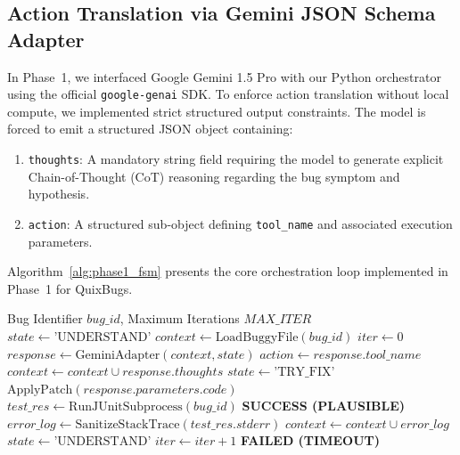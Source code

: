 \documentclass[12pt,a4paper]{report}
\begin{document}
\subsection{Action Translation via Gemini JSON Schema Adapter}
In Phase~1, we interfaced Google Gemini 1.5 Pro with our Python orchestrator using the official \texttt{google-genai} SDK. To enforce action translation without local compute, we implemented strict structured output constraints. The model is forced to emit a structured JSON object containing:
\begin{enumerate}
    \item \texttt{thoughts}: A mandatory string field requiring the model to generate explicit Chain-of-Thought (CoT) reasoning regarding the bug symptom and hypothesis.
    \item \texttt{action}: A structured sub-object defining \texttt{tool\_name} and associated execution parameters.
\end{enumerate}

Algorithm~\ref{alg:phase1_fsm} presents the core orchestration loop implemented in Phase~1 for QuixBugs.

\begin{algorithm}[htbp]
\caption{Phase 1 LAM Finite State Machine Orchestration Loop}
\label{alg:phase1_fsm}
\begin{algorithmic}[1]
\Require Bug Identifier $\mathit{bug\_id}$, Maximum Iterations $\mathit{MAX\_ITER}$
\State $\mathit{state} \gets \text{'UNDERSTAND'}$
\State $\mathit{context} \gets \text{LoadBuggyFile}(\mathit{bug\_id})$
\State $\mathit{iter} \gets 0$
    \State $\mathit{response} \gets \text{GeminiAdapter}(\mathit{context}, \mathit{state})$
    \State $\mathit{action} \gets \mathit{response}.\mathit{tool\_name}$
        \State $\mathit{context} \gets \mathit{context} \cup \mathit{response}.\mathit{thoughts}$
        \State $\mathit{state} \gets \text{'TRY\_FIX'}$
        \State $\text{ApplyPatch}(\mathit{response}.\mathit{parameters}.\mathit{code})$
        \State $\mathit{test\_res} \gets \text{RunJUnitSubprocess}(\mathit{bug\_id})$
            \State \Return \textbf{SUCCESS (PLAUSIBLE)}
        \Else
            \State $\mathit{error\_log} \gets \text{SanitizeStackTrace}(\mathit{test\_res}.\mathit{stderr})$
            \State $\mathit{context} \gets \mathit{context} \cup \mathit{error\_log}$
            \State $\mathit{state} \gets \text{'UNDERSTAND'}$
        \EndIf
    \EndIf
    \State $\mathit{iter} \gets \mathit{iter} + 1$
\EndWhile
\State \Return \textbf{FAILED (TIMEOUT)}
\end{algorithmic}
\end{algorithm}
\end{document}
